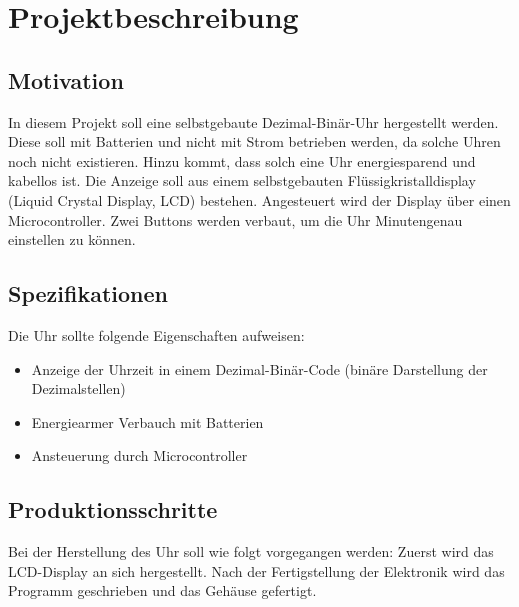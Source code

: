 \section{Projektbeschreibung}
\subsection{Motivation}
In diesem Projekt soll eine selbstgebaute Dezimal-Binär-Uhr hergestellt werden. Diese soll mit Batterien und nicht mit Strom betrieben werden, da solche Uhren noch nicht existieren. Hinzu kommt, dass solch eine Uhr energiesparend und kabellos ist. Die Anzeige soll aus einem selbstgebauten Flüssigkristalldisplay (Liquid Crystal Display, LCD) bestehen. Angesteuert wird der Display über einen Microcontroller. Zwei Buttons werden verbaut, um die Uhr Minutengenau einstellen zu können.

\subsection{Spezifikationen}
Die Uhr sollte folgende Eigenschaften aufweisen:
\begin{itemize}
\item Anzeige der Uhrzeit in einem Dezimal-Binär-Code (binäre Darstellung der Dezimalstellen)
\item Energiearmer Verbauch mit Batterien
\item Ansteuerung durch Microcontroller
\end{itemize}

\subsection{Produktionsschritte}

Bei der Herstellung des Uhr soll wie folgt vorgegangen werden: Zuerst wird das LCD-Display an sich hergestellt. Nach der Fertigstellung der Elektronik wird das Programm geschrieben und das Gehäuse gefertigt. 

